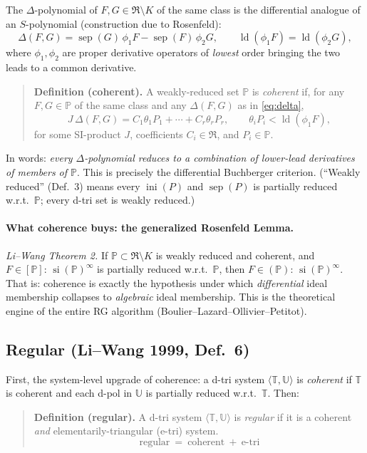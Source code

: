 \documentclass[11pt]{article}
\newcommand{\sat}[2]{[#1]\!:\!#2^{\infty}}
\newcommand{\satalg}[2]{(#1)\!:\!#2^{\infty}}
\newcommand{\ld}{\operatorname{ld}}
\newcommand{\sep}{\operatorname{sep}}
\newcommand{\ini}{\operatorname{ini}}
\newcommand{\si}{\operatorname{si}}
\newcommand{\R}{\mathfrak{R}}
\newcommand{\PP}{\mathbb{P}}
\newcommand{\TT}{\mathbb{T}}
\newcommand{\UU}{\mathbb{U}}
\begin{document}
The $\Delta$-polynomial of $F,G\in\R\setminus K$ of the same class is the
differential analogue of an $S$-polynomial (construction due to Rosenfeld):
\begin{equation}\label{eq:delta}
  \Delta(F,G)=\sep(G)\,\phi_1 F-\sep(F)\,\phi_2 G,
  \qquad \ld(\phi_1 F)=\ld(\phi_2 G),
\end{equation}
where $\phi_1,\phi_2$ are proper derivative operators of \emph{lowest} order
bringing the two leads to a common derivative.

\begin{quote}
\textbf{Definition (coherent).} A weakly-reduced set $\PP$ is \emph{coherent}
if, for any $F,G\in\PP$ of the same class and any $\Delta(F,G)$ as in
\eqref{eq:delta},
\[
  J\,\Delta(F,G)=C_1\theta_1 P_1+\cdots+C_r\theta_r P_r,
  \qquad \theta_i P_i<\ld(\phi_1 F),
\]
for some SI-product $J$, coefficients $C_i\in\R$, and $P_i\in\PP$.
\end{quote}

In words: \emph{every $\Delta$-polynomial reduces to a combination of
lower-lead derivatives of members of $\PP$}. This is precisely the differential
Buchberger criterion. (``Weakly reduced'' (Def.~3) means every $\ini(P)$ and
$\sep(P)$ is partially reduced w.r.t.\ $\PP$; every d-tri set is weakly reduced.)

\paragraph{What coherence buys: the generalized Rosenfeld Lemma.}
\emph{Li--Wang Theorem 2.} If $\PP\subset\R\setminus K$ is weakly reduced and
coherent, and $F\in\sat{\PP}{\,\si(\PP)}$ is partially reduced w.r.t.\ $\PP$,
then $F\in\satalg{\PP}{\,\si(\PP)}$. That is: coherence is exactly the
hypothesis under which \emph{differential} ideal membership collapses to
\emph{algebraic} ideal membership. This is the theoretical engine of the entire
RG algorithm (Boulier--Lazard--Ollivier--Petitot).

\subsection{Regular (Li--Wang 1999, Def.~6)}

First, the system-level upgrade of coherence: a d-tri system $\langle
\TT,\UU\rangle$ is \emph{coherent} if $\TT$ is coherent and each d-pol in $\UU$
is partially reduced w.r.t.\ $\TT$. Then:

\begin{quote}
\textbf{Definition (regular).} A d-tri system $\langle\TT,\UU\rangle$ is
\emph{regular} if it is a coherent \emph{and} elementarily-triangular (e-tri)
system.
\[
  \boxed{\ \text{regular}\ =\ \text{coherent}\ +\ \text{e-tri}\ }
\]
\end{quote}
\end{document}
